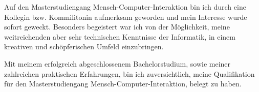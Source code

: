 \documentclass[11pt, a4paper]{awesome-cv}
\begin{document}
\begin{cvletter}

  Auf den Masterstudiengang Mensch-Computer-Interaktion bin ich durch eine Kollegin bzw. Kommilitonin aufmerksam geworden und mein Interesse wurde sofort geweckt. Besonders begeistert war ich von der Möglichkeit, meine weitreichenden aber sehr technischen Kenntnisse der Informatik, in einem kreativen und schöpferischen Umfeld einzubringen.


  Mit meinem erfolgreich abgeschlossenem Bachelorstudium, sowie meiner zahlreichen praktischen Erfahrungen, bin ich zuversichtlich, meine Qualifikation für den Masterstudiengang Mensch-Computer-Interaktion, belegt zu haben.

  \makeletterclosing

\end{cvletter}



\newpage
\end{document}
